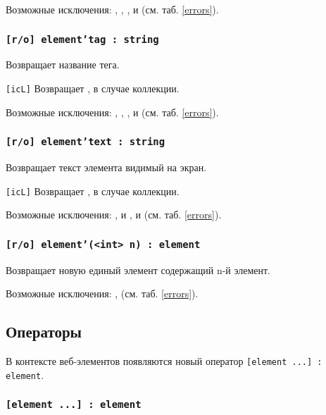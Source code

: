 Возможные исключения: , , ,  и  (см. таб. \ref{errors}).

\subsubsection{\texttt{[r/o] element'tag : string}}

Возвращает название тега.

\texttt{[icL]} Возвращает \listtype, в случае коллекции.

Возможные исключения: , , ,  и  (см. таб. \ref{errors}).

\subsubsection{\texttt{[r/o] element'text : string}}

Возвращает текст элемента видимый на экран. 

\texttt{[icL]} Возвращает \listtype, в случае коллекции.

Возможные исключения: ,  и ,  и  (см. таб. \ref{errors}).

\subsubsection{\texttt{[r/o] element'(<int> n) : element}}

Возвращает новую единый элемент содержащий n-й элемент.

Возможные исключения: ,  (см. таб. \ref{errors}).

\subsection{Операторы}

В контексте веб-элементов появляются новый оператор \texttt{[element ...] : element}.

\subsubsection{\texttt{[element ...] : element}}

